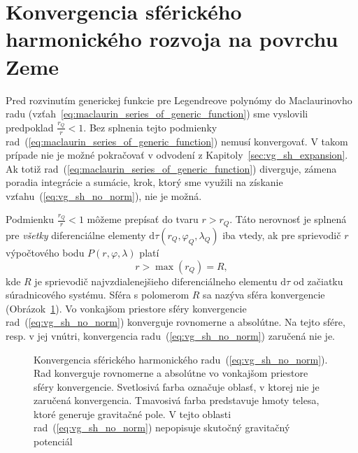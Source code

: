 \documentclass[a4paper, 12pt]{book}
\newcommand{\diff}{\mathrm d}
\begin{document}

\section{Konvergencia sférického harmonického rozvoja na povrchu Zeme}
\label{sec:convergence_of_spherical_harmonics}

Pred rozvinutím generickej funkcie pre Legendreove polynómy do Maclaurinovho 
radu (vzťah~\ref{eq:maclaurin_series_of_generic_function}) sme vyslovili 
predpoklad $\frac{r_Q}{r} < 1$.  Bez splnenia tejto podmienky 
rad~(\ref{eq:maclaurin_series_of_generic_function}) nemusí konvergovať.  
V takom prípade nie je možné pokračovať v odvodení 
z Kapitoly~\ref{sec:vg_sh_expansion}.  Ak totiž 
rad~(\ref{eq:maclaurin_series_of_generic_function}) diverguje, zámena poradia 
integrácie a sumácie, krok, ktorý sme využili na získanie 
vzťahu~(\ref{eq:vg_sh_no_norm}), nie je možná.

Podmienku $\frac{r_Q}{r} < 1$ môžeme prepísať do tvaru $r > r_Q$.  Táto 
nerovnosť je splnená pre \emph{všetky} diferenciálne elementy $\diff \tau(r_Q, 
\varphi_Q, \lambda_Q)$ iba vtedy, ak pre sprievodič $r$ výpočtového bodu $P(r, 
\varphi, \lambda)$ platí
%
\begin{equation}
r > \max(r_Q) = R{,}
\end{equation}
%
kde $R$ je sprievodič najvzdialenejšieho diferenciálneho elementu $\diff\tau$ 
od začiatku súradnicového systému.  Sféra s polomerom $R$ sa nazýva sféra 
konvergencie \citep{Hotine} 
(Obrázok~\ref{fig:spherical_harmonics_convergence}).  Vo vonkajšom priestore 
sféry konvergencie rad~(\ref{eq:vg_sh_no_norm}) konverguje rovnomerne 
a absolútne.  Na tejto sfére, resp. v jej vnútri, konvergencia 
radu~(\ref{eq:vg_sh_no_norm}) zaručená nie je.

\begin{figure}
\centering

\caption{Konvergencia sférického harmonického radu~(\ref{eq:vg_sh_no_norm}).  
Rad konverguje rovnomerne a absolútne vo vonkajšom priestore sféry 
konvergencie.  Svetlosivá farba označuje oblasť, v ktorej nie je zaručená 
konvergencia.  Tmavosivá farba predstavuje hmoty telesa, ktoré generuje 
gravitačné pole.  V tejto oblasti rad~(\ref{eq:vg_sh_no_norm}) nepopisuje 
skutočný gravitačný potenciál}
\label{fig:spherical_harmonics_convergence}
\end{figure}
\end{document}
